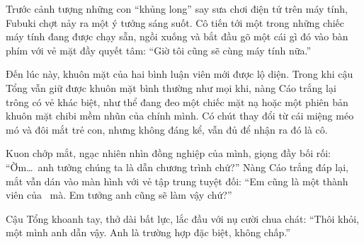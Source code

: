 \documentclass[../main.tex]{subfiles}
\begin{document}









\pov{-}

Trước cảnh tượng những con ``khủng long'' say sưa chơi điện tử trên máy tính, Fubuki chợt nảy ra một ý tưởng sáng suốt. Cô tiến tới một trong những chiếc máy tính đang được chạy sẵn, ngồi xuống và bắt đầu gõ một cái gì đó vào bàn phím với vẻ mặt đầy quyết tâm: ``Giờ tôi cũng sẽ cùng máy tính nữa.''

Đến lúc này, khuôn mặt của hai bình luận viên mới được lộ diện. Trong khi cậu Tổng vẫn giữ được khuôn mặt bình thường như mọi khi, nàng Cáo trắng lại trông có vẻ khác biệt, như thể đang đeo một chiếc mặt nạ hoặc một phiên bản khuôn mặt chibi mềm nhũn của chính mình. Có chút thay đổi từ cái miệng méo mó và đôi mắt trẻ con, nhưng không đáng kể, vẫn đủ để nhận ra đó là cô.


Kuon chớp mắt, ngạc nhiên nhìn đồng nghiệp của mình, giọng đầy bối rối: ``Ờm\dots\ anh tưởng chúng ta là dẫn chương trình chứ?'' Nàng Cáo trắng đáp lại, mắt vẫn dán vào màn hình với vẻ tập trung tuyệt đối: ``Em cũng là một thành viên của \hll\ mà. Em tưởng anh cũng sẽ làm vậy chứ?''

Cậu Tổng khoanh tay, thở dài bất lực, lắc đầu với nụ cười chua chát: ``Thôi khỏi, một mình anh dẫn vậy. Anh là trường hợp đặc biệt, không chấp.''
\end{document}
